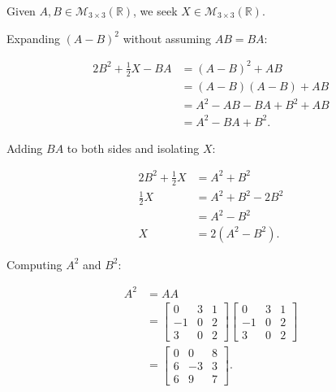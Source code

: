 \begin{answer}
    Given $A, B \in \mathcal{M}_{3\times3}(\mathbb{R})$,
    we seek $X \in \mathcal{M}_{3\times3}(\mathbb{R})$.

    Expanding $(A-B)^2$ without assuming $AB=BA$:

    $$
    \begin{aligned}
        2B^2 + \frac{1}{2}X - BA
            &= (A-B)^2 + AB \\[0.5em]
            &= (A-B)(A-B) + AB \\[0.5em]
            &= A^2 - AB - BA + B^2 + AB \\[0.5em]
            &= A^2 - BA + B^2.
    \end{aligned}
    $$

    Adding $BA$ to both sides and isolating $X$:

    $$
    \begin{aligned}
        2B^2 + \frac{1}{2}X
            &= A^2 + B^2 \\[0.5em]
        \frac{1}{2}X
            &= A^2 + B^2 - 2B^2 \\[0.5em]
            &= A^2 - B^2 \\[0.5em]
        X &= 2(A^2 - B^2).
    \end{aligned}
    $$

    Computing $A^2$ and $B^2$:

    $$
    \begin{aligned}
        A^2 &= AA \\
        &= \begin{bmatrix}
            0 & 3 & 1 \\
            -1 & 0 & 2 \\
            3 & 0 & 2
        \end{bmatrix}
        \begin{bmatrix}
            0 & 3 & 1 \\
            -1 & 0 & 2 \\
            3 & 0 & 2
        \end{bmatrix} \\[1em]
        &= \begin{bmatrix}
            0 & 0 & 8 \\
            6 & -3 & 3 \\
            6 & 9 & 7
        \end{bmatrix}.
    \end{aligned}
    $$


\end{answer}
